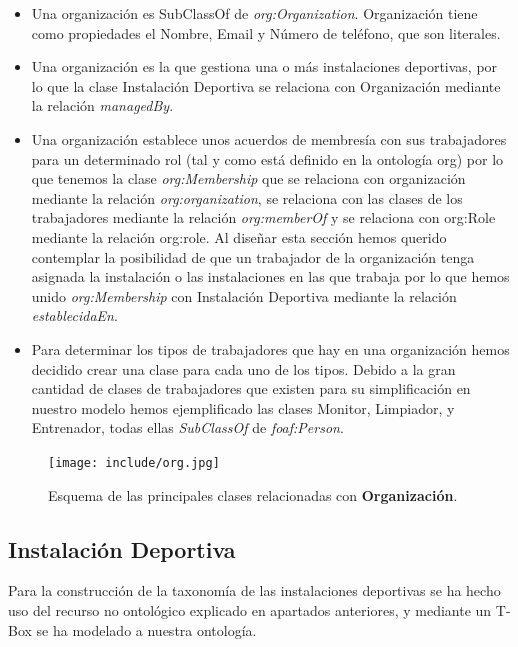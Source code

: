 \documentclass[a4paper,12pt]{article}
\begin{document}
	\begin{itemize}
		\item Una organización es SubClassOf de \textit{org:Organization}. Organización tiene como
propiedades el Nombre, Email y Número de teléfono, que son literales.
		\item Una organización es la que gestiona una o más instalaciones deportivas, por lo que la
clase Instalación Deportiva se relaciona con Organización mediante la relación
\textit{managedBy}.
		\item Una organización establece unos acuerdos de membresía con sus trabajadores para un
determinado rol (tal y como está definido en la ontología org) por lo que tenemos la clase
\textit{org:Membership} que se relaciona con organización mediante la relación
\textit{org:organization}, se relaciona con las clases de los trabajadores mediante la relación
\textit{org:memberOf} y se relaciona con org:Role mediante la relación org:role. Al diseñar esta
sección hemos querido contemplar la posibilidad de que un trabajador de la organización
tenga asignada la instalación o las instalaciones en las que trabaja por lo que hemos unido
\textit{org:Membership} con Instalación Deportiva mediante la relación \textit{establecidaEn}.
		\item Para determinar los tipos de trabajadores que hay en una organización hemos decidido
crear una clase para cada uno de los tipos. Debido a la gran cantidad de clases de
trabajadores que existen para su simplificación en nuestro modelo hemos ejemplificado
las clases Monitor, Limpiador, y Entrenador, todas ellas \textit{SubClassOf} de \textit{foaf:Person}.
	\end{itemize}

	\begin{figure}[H]
		\centering
		\texttt{[image: include/org.jpg]}
		\caption{Esquema de las principales clases relacionadas con \textbf{Organización}.}
	\end{figure}
	
	\subsection{Instalación Deportiva}
	
	Para la construcción de la taxonomía de las instalaciones deportivas se ha hecho uso del recurso
no ontológico explicado en apartados anteriores, y mediante un T-Box se ha modelado a nuestra
ontología.
	
\end{document}
